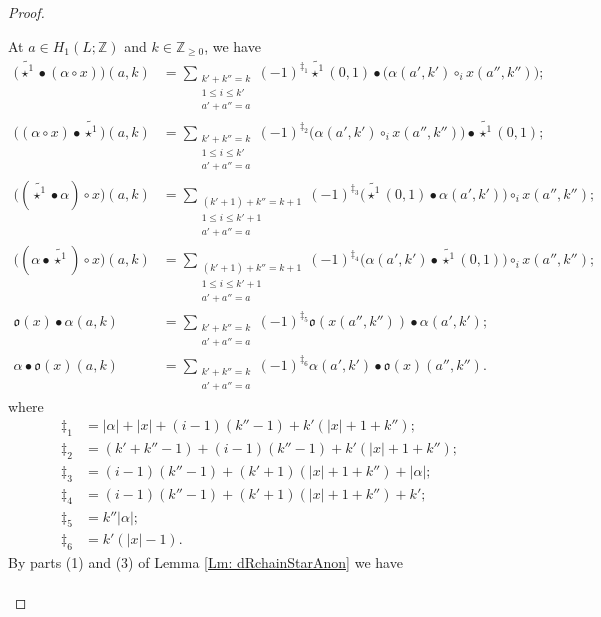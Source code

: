 \documentclass[10pt]{amsart}
\numberwithin{equation}{section}
\theoremstyle{plain}
\theoremstyle{definition}
\theoremstyle{remark}
\numberwithin{equation}{section}
\newcommand{\Z}{\mathbb{Z}}
\newcommand{\wt}[1]{\widetilde{#1}}
\begin{document}
{\begin{proof}
\begin{itemize}
	At $a\in H_1(L;\Z)$ and $k\in\Z_{\geq 0}$, we have 
	\begin{align*}
		\big(\wt{\star^1}\bullet (\alpha\circ x)\big)(a,k) &= \sum_{\substack{k'+k''= k\\ 1\leq i \leq k' \\ a'+a''= a}} (-1)^{\ddagger_1} \wt{\star^1}(0,1) \bullet \big( \alpha(a',k')\circ_i x(a'',k'')\big);\\
		\big((\alpha\circ x)\bullet \wt{\star^1}\big)(a,k)
		&= \sum_{\substack{k'+k'' = k\\1\leq i \leq k'\\ a'+a''=a}}(-1)^{\ddagger_2} \big(\alpha(a',k') \circ_i x(a'',k'') \big)\bullet \wt{\star^1}(0,1);\\
		\big((\wt{\star^1}\bullet \alpha)\circ x\big)(a,k)&= \sum_{\substack{(k'+1)+k''=k+1 \\ 1\leq i \leq k'+1 \\ a'+a''=a}}(-1)^{\ddagger_3} \big(\wt{\star^1}(0,1)\bullet \alpha(a',k')\big)\circ_i x(a'',k'');\\
		\big((\alpha\bullet \wt{\star^1}) \circ x\big)(a,k)&= \sum_{\substack{(k'+1)+k''=k+1 \\ 1\leq i \leq k'+1 \\ a'+a''=a}}(-1)^{\ddagger_4} \big( \alpha(a',k')\bullet \wt{\star^1}(0,1) \big) \circ_i x(a'',k'');\\
		\mathfrak{o}(x)\bullet \alpha (a,k) &= \sum_{\substack{k'+k'' = k \\ a'+a'' = a}} (-1)^{\ddagger_5} \mathfrak{o}(x(a'',k'')) \bullet \alpha(a',k');\\
		\alpha\bullet \mathfrak{o}(x)(a,k)&= \sum_{\substack{k'+k''= k\\ a'+a'' = a}} (-1)^{\ddagger_6} \alpha(a',k')\bullet \mathfrak{o}(x)(a'',k'').
	\end{align*}
	where 
	\begin{align*}
		\ddagger_1 &=|\alpha|+|x| + (i-1)(k''-1)+k'(|x|+1+k'');\\
		\ddagger_2 &= (k'+k''-1)+(i-1)(k''-1)+k'(|x|+1+k'');\\
		\ddagger_3 &= (i-1)(k''-1) + (k'+1) (|x|+1+k'') + |\alpha|;\\
		\ddagger_4 &= (i-1)(k''-1) + (k'+1)(|x|+1+k'') + k'; \\
		\ddagger_5 &= k''|\alpha|;\\ 
		\ddagger_6 &= k'(|x|-1).
	\end{align*}
By parts (1) and (3) of Lemma \ref{Lm: dRchainStarAnon} we have 
\begin{align*}

\end{align*}
\end{itemize}
\end{proof}}
\end{document}
